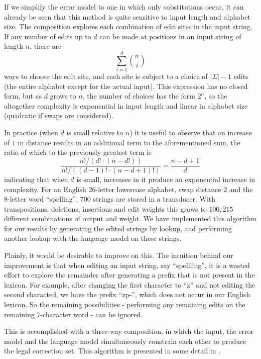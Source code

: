 \documentclass[free]{flammie}
\begin{document}
If we simplify the error model to one in which only substitutions occur, it can
already be seen that this method is quite sensitive to input length and
alphabet size. The composition explores each combination of edit sites in the
input string. If any number of edits up to $d$ can be made at positions in an
input string of length $n$, there are
\begin{displaymath}
\sum_{i=1}^{d} {n \choose i}
\end{displaymath}
ways to choose the edit site, and each site is subject to a choice of
$|\Sigma| - 1$ edits (the
entire alphabet except for the actual input). This expression has no closed
form, but as $d$ grows to $n$, the number of choices has the form $2^n$,
so the altogether complexity is exponential in input length and linear
in alphabet size (quadratic if swaps are considered).

In practice
(when $d$ is small relative to $n$) it is useful to observe that an
increase of $1$ in distance results
in an additional term to the aforementioned sum,
the ratio of which to the previously greatest term is
\begin{displaymath}
\frac{n!/(d!\cdot(n-d!))}{n!/((d-1)!\cdot(n-d+1)!)} = \frac{n-d+1}{d}
\end{displaymath}
indicating that when $d$ is small, increases in it produce an
exponential increase in complexity.
For an English 26-letter lowercase alphabet, swap
distance $2$ and the $8$-letter word ``spelling'', $700$ strings are
stored in a transducer. With transpositions, deletions, insertions and edit
weights this grows to $100,215$ different combinations of output and weight. We
have implemented this algorithm for our results by generating the edited
strings by lookup, and performing another lookup with the language model on
these strings.

Plainly, it would be desirable to improve on this. The intuition behind our
improvement is that when editing an input string, say ``spellling'', it is a
wasted effort to explore the remainder after generating a prefix that is not
present in the lexicon. For example, after changing the first character to ``z''
and not editing the second characted, we have the prefix \mbox{``zp-''}, which does
not occur in our English lexicon. So the remaining possibilities - performing
any remaining edits on the remaining $7$-character word - can be ignored.

This is accomplished with a three-way composition, in which the input, the
error model and the language model simultaneously constrain each other to
produce the legal correction set. This algorithm is presented in some detail
in \cite{hfst/2012/cla}.
\end{document}
